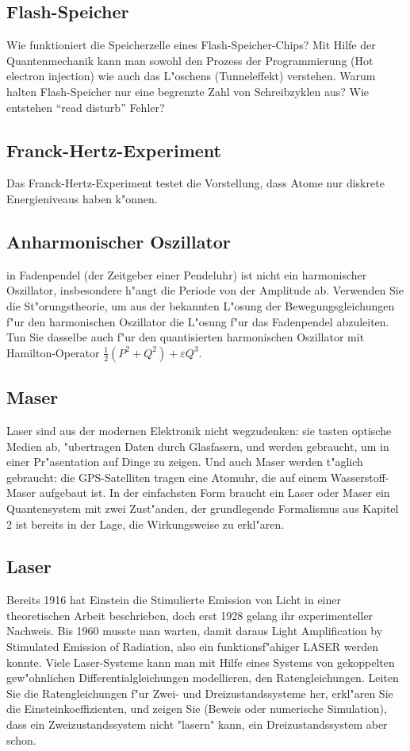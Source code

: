 \subsection{Flash-Speicher}
Wie funktioniert die Speicherzelle eines Flash-Speicher-Chips? Mit
Hilfe der Quantenmechanik kann man sowohl den Prozess der Programmierung
(Hot electron injection) wie auch das L"oschens (Tunneleffekt)
verstehen. Warum halten Flash-Speicher nur eine begrenzte Zahl von
Schreibzyklen aus? Wie entstehen ``read disturb'' Fehler?

\subsection{Franck-Hertz-Experiment}
Das Franck-Hertz-Experiment testet die Vorstellung, dass Atome nur
diskrete Energieniveaus haben k"onnen.

\subsection{Anharmonischer Oszillator}
in Fadenpendel (der Zeitgeber einer Pendeluhr) ist nicht ein
harmonischer Oszillator, insbesondere h"angt die Periode von der
Amplitude ab. Verwenden Sie die St"orungstheorie, um aus der bekannten
L"osung der Bewegungsgleichungen f"ur den harmonischen Oszillator die
L"osung f"ur das Fadenpendel abzuleiten. Tun Sie dasselbe auch f"ur
den quantisierten harmonischen Oszillator mit Hamilton-Operator
$\frac12 (P^2+Q^2)+\varepsilon Q^3$.

\subsection{Maser}
Laser sind aus der modernen Elektronik nicht wegzudenken: sie tasten
optische Medien ab, "ubertragen Daten durch Glasfasern, und werden
gebraucht, um in einer Pr"asentation auf Dinge zu zeigen. Und auch
Maser werden t"aglich gebraucht: die GPS-Satelliten tragen eine
Atomuhr, die auf einem Wasserstoff-Maser aufgebaut ist. In der
einfachsten Form braucht ein Laser oder Maser ein Quantensystem mit
zwei Zust"anden, der grundlegende Formalismus aus Kapitel 2 ist
bereits in der Lage, die Wirkungsweise zu erkl"aren.

\subsection{Laser}
Bereits 1916 hat Einstein die Stimulierte Emission von Licht in
einer theoretischen Arbeit beschrieben, doch erst 1928 gelang ihr
experimenteller Nachweis. Bis 1960 musste man warten, damit daraus
Light Amplification by Stimulated Emission of Radiation, also ein
funktionsf"ahiger LASER werden konnte. Viele Laser-Systeme kann man
mit Hilfe eines Systems von gekoppelten gew"ohnlichen
Differentialgleichungen modellieren, den Ratengleichungen. Leiten
Sie die Ratengleichungen f"ur Zwei- und Dreizustandssysteme her,
erkl"aren Sie die Einsteinkoeffizienten, und zeigen Sie (Beweis oder
numerische Simulation), dass ein Zweizustandssystem nicht "lasern"
kann, ein Dreizustandssystem aber schon.

